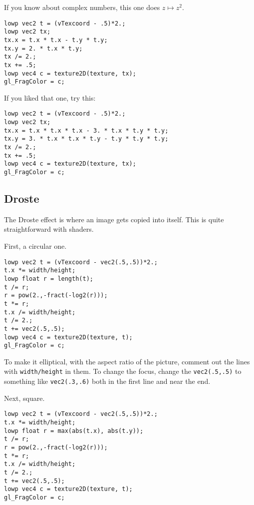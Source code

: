\documentclass[
  html5,%
  mathml,%
  use filename%
]{internet}
\begin{document}
If you know about complex numbers, this one does \(z \mapsto z^2\).

\begin{tcolorbox}
\begin{verbatim}
lowp vec2 t = (vTexcoord - .5)*2.;
lowp vec2 tx;
tx.x = t.x * t.x - t.y * t.y;
tx.y = 2. * t.x * t.y;
tx /= 2.;
tx += .5;
lowp vec4 c = texture2D(texture, tx);
gl_FragColor = c;
\end{verbatim}
\end{tcolorbox}

If you liked that one, try this:

\begin{tcolorbox}
\begin{verbatim}
lowp vec2 t = (vTexcoord - .5)*2.;
lowp vec2 tx;
tx.x = t.x * t.x * t.x - 3. * t.x * t.y * t.y;
tx.y = 3. * t.x * t.x * t.y - t.y * t.y * t.y;
tx /= 2.;
tx += .5;
lowp vec4 c = texture2D(texture, tx);
gl_FragColor = c;
\end{verbatim}
\end{tcolorbox}

\subsection{Droste}

The Droste effect is where an image gets copied into itself.
This is quite straightforward with shaders.

First, a circular one.

\begin{tcolorbox}
\begin{verbatim}
lowp vec2 t = (vTexcoord - vec2(.5,.5))*2.;
t.x *= width/height;
lowp float r = length(t);
t /= r;
r = pow(2.,-fract(-log2(r)));
t *= r;
t.x /= width/height;
t /= 2.;
t += vec2(.5,.5);
lowp vec4 c = texture2D(texture, t);
gl_FragColor = c;
\end{verbatim}
\end{tcolorbox}

To make it elliptical, with the aspect ratio of the picture, comment out the lines with \verb+width/height+ in them.
To change the focus, change the \verb+vec2(.5,.5)+ to something like \verb+vec2(.3,.6)+ both in the first line and near the end.

Next, square.

\begin{tcolorbox}
\begin{verbatim}
lowp vec2 t = (vTexcoord - vec2(.5,.5))*2.;
t.x *= width/height;
lowp float r = max(abs(t.x), abs(t.y));
t /= r;
r = pow(2.,-fract(-log2(r)));
t *= r;
t.x /= width/height;
t /= 2.;
t += vec2(.5,.5);
lowp vec4 c = texture2D(texture, t);
gl_FragColor = c;
\end{verbatim}
\end{tcolorbox}
\end{document}
